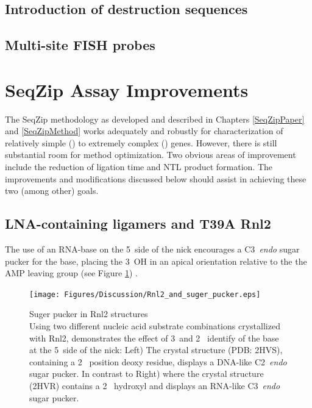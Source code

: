   \subsection{Introduction of destruction sequences}\label{Disc:subsec:Intro of Desctruction Sequences}


  \subsection{Multi-site FISH probes}\label{Disc:subsec:Multi-site FISH probes}


\section{SeqZip Assay Improvements}\label{Disc:sec:SeqZip Improvements}

  The SeqZip methodology as developed and described in Chapters \ref{SeqZipPaper} and \ref{SeqZipMethod} works adequately and robustly for characterization of relatively simple (\cd{}) to extremely complex (\dscam{}) genes. However, there is still substantial room for method optimization. Two obvious areas of improvement include the reduction of ligation time and NTL product formation. The improvements and modifications discussed below should assist in achieving these two (among other) goals.

  \subsection{LNA-containing ligamers and T39A Rnl2}\label{Disc:subsec:LNA-Containing ligamers and T39A Rnk2}

    The use of an RNA-base on the 5\textprime~side of the nick encourages a C3\textprime~\textit{endo} sugar pucker for the base, placing the 3\textprime~OH in an apical orientation relative to the the AMP leaving group (see Figure \ref{Disc:fig:Rnl2 and suger pucker}) \citep{Nandakumar2006}.

    \begin{figure} %
      \centering 
      \texttt{[image: Figures/Discussion/Rnl2\_and\_suger\_pucker.eps]}
      \caption[Suger pucker in Rnl2 structures]
      {Suger pucker in Rnl2 structures \\[0.25cm]
        Using two different nucleic acid substrate combinations crystallized with Rnl2, \citet{Nandakumar2006} demonstrates the effect of 3\textprime~and 2\textprime~ identify of the base at the 5\textprime~side of the nick: Left) The crystal structure (PDB: 2HVS), containing a 2\textprime~ position deoxy residue, displays a DNA-like C2\textprime~\textit{endo} sugar pucker. In contrast to Right) where the crystal structure (2HVR) contains a 2\textprime~ hydroxyl and displays an RNA-like C3\textprime~\textit{endo} sugar pucker.
        }
        \label{Disc:fig:Rnl2 and suger pucker}
        \end{figure}

